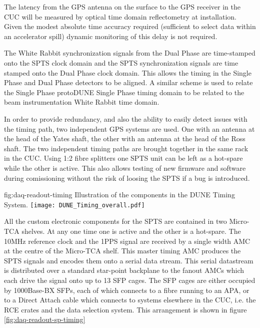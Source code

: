 The latency from the GPS antenna on the surface to the GPS receiver in
the CUC will be measured by optical time domain reflectometry at
installation. Given the modest absolute time accuracy required
(sufficient to select data within an accelerator spill) dynamic
monitoring of this delay is not required.

The White Rabbit synchronization signals from the Dual Phase are
time-stamped onto the SPTS clock domain and the SPTS synchronization
signals are time stamped onto the Dual Phase clock domain. This allows
the timing in the Single Phase and Dual Phase detectors to be
aligned. A similar scheme is used to relate the Single Phase protoDUNE
Single Phase timing domain to be related to the beam instrumentation
White Rabbit time domain.

In order to provide redundancy, and also the ability to easily detect
issues with the timing path, two independent GPS systems are used. One
with an antenna at the head of the Yates shaft, the other with an
antenna at the head of the Ross shaft. The two independent timing
paths are brought together in the same rack in the CUC. Using 1:2
fibre splitters one SPTS unit can be left as a hot-spare while the
other is active. This also allows testing of new firmware and software
during comissioning without the risk of loosing the SPTS if a bug is
introduced.


\begin{dunefigure}{fig:daq-readout-timing}
  {Illustration of the components in the DUNE Timing System.}
\texttt{[image: DUNE\_Timing\_overall.pdf]}
\end{dunefigure}

All the custom electronic components for the SPTS are contained in two
Micro-TCA shelves. At any one time one is active and the other is a
hot-spare. The 10MHz reference clock and the 1PPS signal are received
by a single width AMC at the centre of the Micro-TCA shelf. This
master timing AMC produces the SPTS signals and encodes them onto a
serial data stream. This serial datastream is distributed over a
standard star-point backplane to the fanout AMCs which each drive the
signal onto up to 13 SFP cages. The SFP cages are either occupied by
1000Base-BX SFPs, each of which connects to a fibre running to an APA,
or to a Direct Attach cable which connects to systems elsewhere in the
CUC, i.e. the RCE crates and the data selection system. This
arrangement is shown in figure \ref{fig:daq-readout-sp-timing}



